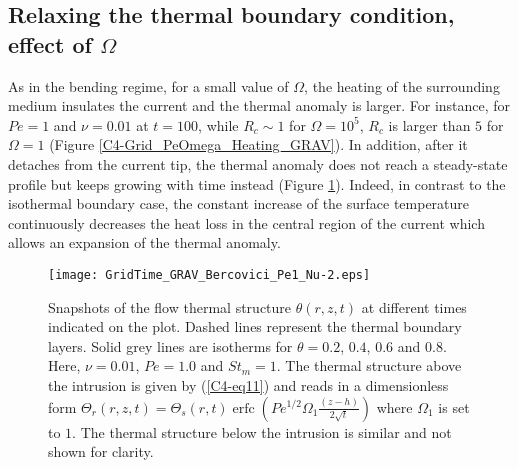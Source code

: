 \subsection{Relaxing  the   thermal  boundary  condition,   effect  of
  $\Omega$}
\label{C4-sec:infl-therm-bound}

As in the  bending regime, for a small value  of $\Omega$, the heating
of  the  surrounding medium  insulates  the  current and  the  thermal
anomaly is larger. For instance, for $Pe=1$ and $\nu=0.01$ at $t=100$,
while  $R_c\sim 1$  for $\Omega=10^5$,  $R_c$ is  larger than  $5$ for
$\Omega   =1   $  (Figure   \ref{C4-Grid_PeOmega_Heating_GRAV}).    In
addition, after it detaches from  the current tip, the thermal anomaly
does  not reach  a steady-state  profile but  keeps growing  with time
instead (Figure \ref{C4-Grid_TIME_GRAV}).  Indeed,  in contrast to the
isothermal  boundary  case,  the  constant  increase  of  the  surface
temperature continuously decreases the heat loss in the central region
of the current which allows an expansion of the thermal anomaly.
\begin{figure}[h!]
  \begin{center}
    \graphicspath{ {/Users/thorey/Documents/These/Projet/Refroidissement/Skin_Model/Figure/Figure_Heating/} }
    \texttt{[image: GridTime\_GRAV\_Bercovici\_Pe1\_Nu-2.eps]}
    \caption{Snapshots of  the flow thermal  structure $\theta(r,z,t)$
      at  different  times  indicated   on  the  plot.   Dashed  lines
      represent  the thermal  boundary  layers. Solid  grey lines  are
      isotherms for  $\theta =  0.2$, $0.4$,  $0.6$ and  $0.8$.  Here,
      $\nu=0.01$,  $Pe =1.0$  and $St_m  = 1$.  The thermal  structure
      above the intrusion  is given by (\ref{C4-eq11}) and  reads in a
      dimensionless                                               form
      $\Theta_r(r,z,t)=\Theta_s(r,t)\operatorname{erfc}{\left(Pe^{1/2}\Omega_1\frac{(z-h)}{2\sqrt{t}}\right)}$
      where $\Omega_1$ is set to  $1$. The thermal structure below the
      intrusion is similar and not shown for clarity.}
    \label{C4-Grid_TIME_GRAV}
  \end{center}
\end{figure}

